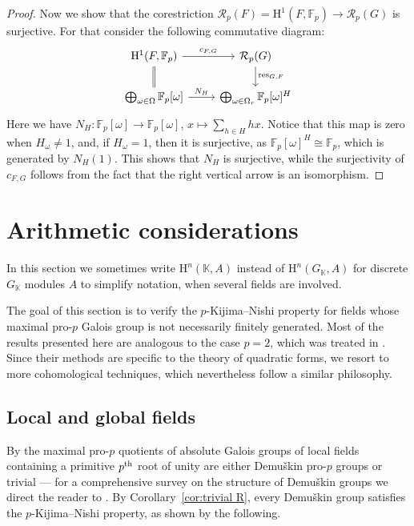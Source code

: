 \documentclass{amsart}
\theoremstyle{definition}
\theoremstyle{remark}
\DeclareMathOperator{\res}{res}
\newcommand{\KK}{\mathbb{K}}
\newcommand{\FF}{\mathbb{F}}
\newcommand{\calR}{\mathcal{R}}
\newcommand{\rmH}{\mathrm H}%
\newcommand{\pth}{{p^{\rm th}}}
\begin{document}
\begin{proof}
    Now we show that the corestriction $\calR_p(F)=\rmH^1(F,\FF_p)\to \calR_p(G)$ is surjective. For that consider the following commutative diagram:
    \begin{equation*}
        \begin{tikzcd}
            \rmH^1(F,\FF_p)\arrow[r,"c_{F,G}"]\arrow[d,equal]&\calR_p(G)\arrow[d,"\res_{G,F}"]\\
            \bigoplus_{\omega \in \Omega}\FF_p[\omega]\arrow[r,"N_{H}"] &\bigoplus_{\omega\in \Omega_r}\FF_p[\omega]^H
        \end{tikzcd}
    \end{equation*}
    Here we have $N_H:\FF_p[\omega]\to \FF_p[\omega]$, $x\mapsto \sum_{h\in H}hx$. Notice that this map is zero when $H_\omega\neq 1$, and, if $H_\omega=1$, then it is surjective, as $\FF_p[\omega]^H\cong \FF_p$, which is generated by $N_H(1)$. This shows that $N_H$ is surjective, while the surjectivity of $c_{F,G}$ follows from the fact that the right vertical arrow is an isomorphism.
\end{proof}




\section{Arithmetic considerations}
\label{sec:Arithmetic and geometric fields}
In this section we sometimes write $\rmH^n(\KK,A)$ instead of $\rmH^n(G_\KK,A)$ for discrete $G_\KK$ modules $A$ to simplify notation, when several fields are involved.


The goal of this section is to verify the $p$-Kijima--Nishi property for fields whose maximal pro-$p$ Galois group is not necessarily finitely generated. Most of the results presented here are analogous to the case $p=2$, which was treated in \cite{BecherLeep2014}. Since their methods are specific to the theory of quadratic forms, we resort to more cohomological techniques, which nevertheless follow a similar philosophy.


\subsection{Local and global fields}
By \cite[Ch.~II, \S~5, Thm.~4]{serre:galc} the maximal pro-$p$
quotients of absolute Galois groups of local fields containing a primitive $\pth$ root of unity are either Demu\v{s}kin pro-$p$ groups or trivial --- for a comprehensive survey on the structure of Demu\v{s}kin groups we direct the reader to \cite[Ch.~III, \S~9]{NSW2008}.
By Corollary~\ref{cor:trivial R}, every Demu\v{s}kin group satisfies the $p$-Kijima--Nishi property, as shown by the following.
\end{document}
